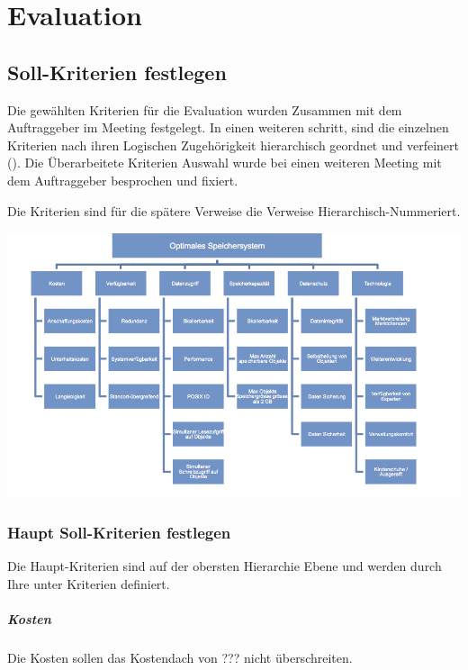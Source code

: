 \cleardoublepage
\chapter{Evaluation}

\section{Soll-Kriterien festlegen}
Die gewählten Kriterien für die Evaluation wurden Zusammen mit dem Auftraggeber im Meeting festgelegt. In einen weiteren schritt, sind die einzelnen Kriterien nach ihren Logischen Zugehörigkeit hierarchisch geordnet und verfeinert (). Die Überarbeitete Kriterien Auswahl wurde bei einen weiteren Meeting mit dem Auftraggeber besprochen und fixiert. 

Die Kriterien sind für die spätere Verweise die Verweise Hierarchisch-Nummeriert.

\begin{center}
\includegraphics[width=\linewidth, keepaspectratio = true]{media/ahp_kirterienbaum.png}
\end{center}

\subsection{Haupt Soll-Kriterien festlegen}
Die Haupt-Kriterien sind auf der obersten Hierarchie Ebene und werden durch Ihre unter Kriterien definiert.
\setcounter{paragraph}{0}
\renewcommand\theparagraph{Soll-\arabic{paragraph}}
\paragraph{Kosten}\label{Soll-1}
Die Kosten sollen das Kostendach von ??? nicht überschreiten. 

